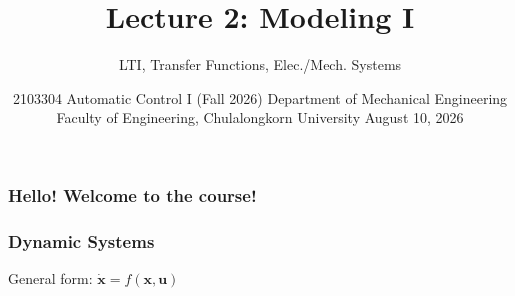 \documentclass[12pt, aspectratio=169, handout]{beamer}
\title[Lecture 2: Modeling I (10 August 2026)] %
{\textbf{Lecture 2: Modeling I}}
\subtitle{LTI, Transfer Functions, Elec./Mech. Systems}
\date[Mech. Eng., Chulalongkorn University] %
{2103304 Automatic Control I (Fall 2026) \newline \newline Department of Mechanical Engineering 
\newline Faculty of Engineering, Chulalongkorn University
\newline \newline August 10, 2026}
\begin{document}
    \maketitle
    \begin{frame}
        \frametitle{Hello! Welcome to the course!}
        \tableofcontents
    \end{frame}

    \begin{frame}
        \frametitle{Dynamic Systems}
        General form: $\mathbf{\dot{x}} = f(\mathbf{x}, \mathbf{u})$
    \end{frame}

\end{document}
